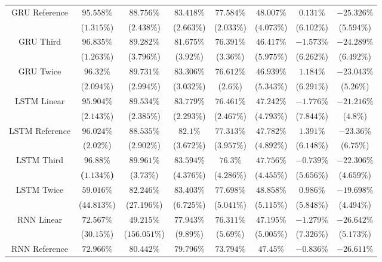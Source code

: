 \begin{table}[!ht]
{\begin{tabular}{|c|c|c|c|c|c|c|c|}
			\multirow{2}{*}{GRU Reference} & $95.558\%$ & $88.756\%$ & $83.418\%$ & $77.584\%$ & $48.007\%$ & $0.131\%$ & $-25.326\%$ \\
			 & ($1.315\%$) & ($2.438\%$) & ($2.663\%$) & ($2.033\%$) & ($4.073\%$) & ($6.102\%$) & ($5.594\%$) \\ \hline
			\multirow{2}{*}{GRU Third} & $96.835\%$ & $89.282\%$ & $81.675\%$ & $76.391\%$ & $46.417\%$ & $-1.573\%$ & $-24.289\%$ \\
			 & ($1.263\%$) & ($3.796\%$) & ($3.92\%$) & ($3.36\%$) & ($5.975\%$) & ($6.262\%$) & ($6.492\%$) \\ \hline
			\multirow{2}{*}{GRU Twice} & $96.32\%$ & $89.731\%$ & $83.306\%$ & $76.612\%$ & $46.939\%$ & $1.184\%$ & $-23.043\%$ \\
			 & ($2.094\%$) & ($2.994\%$) & ($3.032\%$) & ($2.6\%$) & ($5.343\%$) & ($6.291\%$) & ($5.26\%$) \\ \hline
			\multirow{2}{*}{LSTM Linear} & $95.904\%$ & $89.534\%$ & $83.779\%$ & $76.461\%$ & $47.242\%$ & $-1.776\%$ & $-21.216\%$ \\
			 & ($2.143\%$) & ($2.385\%$) & ($2.293\%$) & ($2.467\%$) & ($4.793\%$) & ($7.844\%$) & ($4.8\%$) \\ \hline
			\multirow{2}{*}{LSTM Reference} & $96.024\%$ & $88.535\%$ & $82.1\%$ & $77.313\%$ & $47.782\%$ & $1.391\%$ & $-23.36\%$ \\
			 & ($2.02\%$) & ($2.902\%$) & ($3.672\%$) & ($3.957\%$) & ($4.892\%$) & ($6.148\%$) & ($6.75\%$) \\ \hline
			\multirow{2}{*}{LSTM Third} & $\mathbf{96.88\%}$ & $89.961\%$ & $83.594\%$ & $76.3\%$ & $47.756\%$ & $-0.739\%$ & $-22.306\%$ \\
			 & \textbf{(}$\mathbf{1.134\%}$\textbf{)} & ($3.73\%$) & ($4.376\%$) & ($4.286\%$) & ($4.455\%$) & ($5.656\%$) & ($4.659\%$) \\ \hline
			\multirow{2}{*}{LSTM Twice} & $59.016\%$ & $82.246\%$ & $83.403\%$ & $77.698\%$ & $48.858\%$ & $0.986\%$ & $-19.698\%$ \\
			 & ($44.813\%$) & ($27.196\%$) & ($6.725\%$) & ($5.041\%$) & ($5.115\%$) & ($5.848\%$) & ($4.494\%$) \\ \hline
			\multirow{2}{*}{RNN Linear} & $72.567\%$ & $49.215\%$ & $77.943\%$ & $76.311\%$ & $47.195\%$ & $-1.279\%$ & $-26.642\%$ \\
			 & ($30.15\%$) & ($156.051\%$) & ($9.89\%$) & ($5.69\%$) & ($5.005\%$) & ($7.326\%$) & ($5.173\%$) \\ \hline
			\multirow{2}{*}{RNN Reference} & $72.966\%$ & $80.442\%$ & $79.796\%$ & $73.794\%$ & $47.45\%$ & $-0.836\%$ & $-26.611\%$ \\

\end{tabular}}
\end{table}
